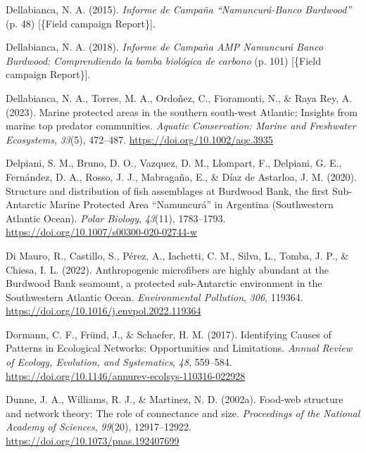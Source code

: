 \documentclass[preprint, 3p,
authoryear]{elsarticle} %
\newlength{\cslhangindent}
\newlength{\cslentryspacingunit} %
\newenvironment{CSLReferences}[2] %
 {%
  \setlength{\parindent}{0pt}
  \ifodd #1
  \let\oldpar\par
  \def\par{\hangindent=\cslhangindent\oldpar}
  \fi
  \setlength{\parskip}{#2\cslentryspacingunit}
 }%
 {}
\begin{document}
\begin{CSLReferences}{1}{0}
\leavevmode{}%
Dellabianca, N. A. (2015). \emph{{Informe de Campaña {``Namuncurá-Banco
Burdwood''}}} (p. 48) {[}\{Field campaign Report\}{]}.

\leavevmode{}%
Dellabianca, N. A. (2018). \emph{{Informe de Campaña AMP Namuncurá
\textendash{} Banco Burdwood: Comprendiendo la bomba biológica de
carbono}} (p. 101) {[}\{Field campaign Report\}{]}.

\leavevmode{}%
Dellabianca, N. A., Torres, M. A., Ordoñez, C., Fioramonti, N., \& Raya
Rey, A. (2023). Marine protected areas in the southern south-west
{Atlantic}: {Insights} from marine top predator communities.
\emph{Aquatic Conservation: Marine and Freshwater Ecosystems},
\emph{33}(5), 472--487. \url{https://doi.org/10.1002/aqc.3935}

\leavevmode{}%
Delpiani, S. M., Bruno, D. O., Vazquez, D. M., Llompart, F., Delpiani,
G. E., Fernández, D. A., Rosso, J. J., Mabragaña, E., \& Díaz de
Astarloa, J. M. (2020). Structure and distribution of fish assemblages
at {Burdwood Bank}, the first {Sub-Antarctic Marine Protected Area}
{``{Namuncurá}''} in {Argentina} ({Southwestern Atlantic Ocean}).
\emph{Polar Biology}, \emph{43}(11), 1783--1793.
\url{https://doi.org/10.1007/s00300-020-02744-w}

\leavevmode{}%
Di Mauro, R., Castillo, S., Pérez, A., Iachetti, C. M., Silva, L.,
Tomba, J. P., \& Chiesa, I. L. (2022). Anthropogenic microfibers are
highly abundant at the {Burdwood Bank} seamount, a protected
sub-{Antarctic} environment in the {Southwestern Atlantic Ocean}.
\emph{Environmental Pollution}, \emph{306}, 119364.
\url{https://doi.org/10.1016/j.envpol.2022.119364}

\leavevmode{}%
Dormann, C. F., Fründ, J., \& Schaefer, H. M. (2017). Identifying
{Causes} of {Patterns} in {Ecological Networks}: {Opportunities} and
{Limitations}. \emph{Annual Review of Ecology, Evolution, and
Systematics}, \emph{48}, 559--584.
\url{https://doi.org/10.1146/annurev-ecolsys-110316-022928}

\leavevmode{}%
Dunne, J. A., Williams, R. J., \& Martinez, N. D. (2002a). Food-web
structure and network theory: {The} role of connectance and size.
\emph{Proceedings of the National Academy of Sciences}, \emph{99}(20),
12917--12922. \url{https://doi.org/10.1073/pnas.192407699}


\end{CSLReferences}
\end{document}

